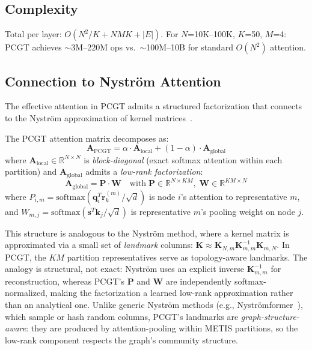 \subsection{Complexity}

Total per layer: $O(N^2/K + NMK + |E|)$. For $N$=10K--100K, $K$=50, $M$=4: PCGT achieves $\sim$3M--220M ops vs.\ $\sim$100M--10B for standard $O(N^2)$ attention.

\subsection{Connection to Nystr\"om Attention}
\label{sec:nystrom}

The effective attention in PCGT admits a structured factorization that connects to the Nystr\"om approximation of kernel matrices~\citep{xiong2021nystromformer}.

\begin{remark}
The PCGT attention matrix decomposes as:
\begin{equation}
\mathbf{A}_{\mathrm{PCGT}} = \alpha \cdot \mathbf{A}_{\mathrm{local}} + (1-\alpha) \cdot \mathbf{A}_{\mathrm{global}}
\label{eq:factorization}
\end{equation}
where $\mathbf{A}_{\mathrm{local}} \in \mathbb{R}^{N \times N}$ is \emph{block-diagonal} (exact softmax attention within each partition) and $\mathbf{A}_{\mathrm{global}}$ admits a \emph{low-rank factorization}:
\begin{equation}
\mathbf{A}_{\mathrm{global}} = \mathbf{P} \cdot \mathbf{W} \quad \text{with}\; \mathbf{P} \in \mathbb{R}^{N \times KM},\; \mathbf{W} \in \mathbb{R}^{KM \times N}
\label{eq:lowrank}
\end{equation}
where $P_{i,m} = \mathrm{softmax}(\mathbf{q}_i^T \mathbf{r}_k^{(m)} / \sqrt{d})$ is node $i$'s attention to representative $m$, and $W_{m,j} = \mathrm{softmax}(\mathbf{s}^T \mathbf{k}_j / \sqrt{d})$ is representative $m$'s pooling weight on node $j$.
\end{remark}

This structure is analogous to the Nystr\"om method, where a kernel matrix is approximated via a small set of \emph{landmark} columns: $\mathbf{K} \approx \mathbf{K}_{N,m} \mathbf{K}_{m,m}^{-1} \mathbf{K}_{m,N}$. In PCGT, the $KM$ partition representatives serve as topology-aware landmarks. The analogy is structural, not exact: Nystr\"om uses an explicit inverse $\mathbf{K}_{m,m}^{-1}$ for reconstruction, whereas PCGT's $\mathbf{P}$ and $\mathbf{W}$ are independently softmax-normalized, making the factorization a learned low-rank approximation rather than an analytical one.  Unlike generic Nystr\"om methods (e.g., Nystr\"omformer~\citep{xiong2021nystromformer}), which sample or hash random columns, PCGT's landmarks are \emph{graph-structure-aware}: they are produced by attention-pooling within METIS partitions, so the low-rank component respects the graph's community structure.

